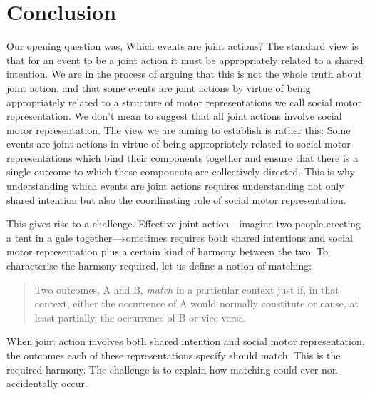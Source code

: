\documentclass[12pt,\papersize]{extarticle}
\begin{document}
\section{Conclusion}
Our opening question was, Which events are joint actions?
The standard view is that for an event to be a joint action it must be appropriately related to a shared intention.
We are in the process of arguing that this is not the whole truth about joint action,
and that some events are joint actions by virtue of being appropriately related to a structure of motor representations we call social motor representation.
We don’t mean to suggest that all joint actions involve social motor representation.
The view we are aiming to establish is rather this: Some events are joint actions in virtue of being appropriately related to social motor representations which bind their components together and ensure that there is a single outcome to which these components are collectively directed.
This is why 
understanding which events are joint actions requires understanding not only shared intention but also
 the coordinating role of social motor representation.

This gives rise to a challenge. 
Effective joint action—imagine two people erecting a tent in a gale together—sometimes requires both shared intentions and social motor representation plus a certain kind of harmony between the two. 
To characterise the harmony required, let us define a notion of matching:
%
\begin{quote}
Two  outcomes, A and B, \emph{match} in a particular context just if, in that context, either the occurrence of A would normally constitute or cause, at least partially, the occurrence of B or vice versa. 
\end{quote}
%
When joint action involves both shared intention and social motor representation, the outcomes each of these representations specify should match.
This is the required harmony.
The challenge is to explain how matching could ever non-accidentally occur.
\end{document}
